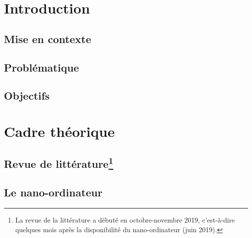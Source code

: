 \documentclass[12pt, letterpaper]{article}
\begin{document}
\section{Introduction}
\subsection{Mise en contexte}

\subsection{Problématique}

\subsection{Objectifs}

\section{Cadre théorique}
\subsection[Revue de littérature]{Revue de littérature\footnote{La revue de la littérature a débuté en octobre-novembre 2019, c'est-à-dire quelques mois après la disponibilité du nano-ordinateur (juin 2019).}}

\subsection{Le nano-ordinateur}

\end{document}
